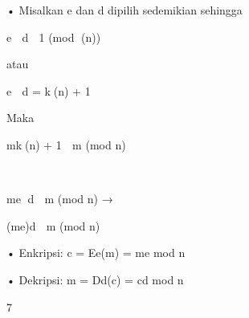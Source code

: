 \documentclass{article}
\begin{document}

• Misalkan e dan d dipilih sedemikian sehingga 

  e  d  1 (mod (n))

 atau


e  d = k(n) + 1

 Maka


mk(n) + 1  m (mod n)






me d  m (mod n)  → 

(me)d  m (mod n)

• Enkripsi:  c = Ee(m) = me mod n

• Dekripsi:  m = Dd(c) = cd mod n 

7
\end{document}
